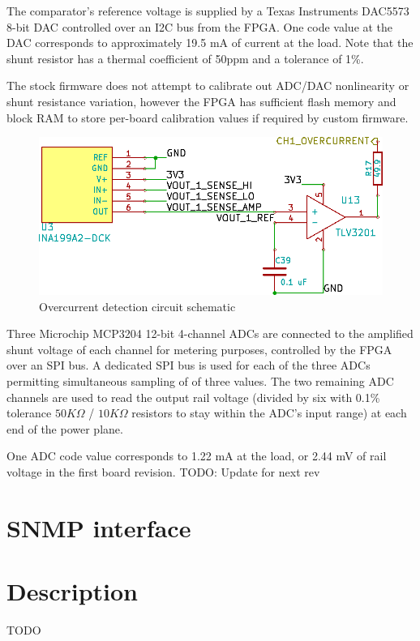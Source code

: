 \documentclass{article}
\begin{document}
The comparator's reference voltage is supplied by a Texas Instruments DAC5573 8-bit DAC controlled over an I2C bus 
from the FPGA. One code value at the DAC corresponds to approximately 19.5 mA of current at the load. Note that the 
shunt resistor has a thermal coefficient of 50ppm and a tolerance of 1\%.

The stock firmware does not attempt to calibrate out ADC/DAC nonlinearity or shunt resistance variation, however the
FPGA has sufficient flash memory and block RAM to store per-board calibration values if required by custom firmware.

\begin{figure}[h!]
\includegraphics[scale=0.25]{output-stage-2.png}
\caption{Overcurrent detection circuit schematic}
\label{output-stage-2}
\end{figure}

Three Microchip MCP3204 12-bit 4-channel ADCs are connected to the amplified shunt voltage of each channel for metering
purposes, controlled by the FPGA over an SPI bus. A dedicated SPI bus is used for each of the three ADCs permitting
simultaneous sampling of of three values. The two remaining ADC channels are used to read the output rail voltage
(divided by six with 0.1\% tolerance $50K\Omega$ / $10K\Omega$ resistors to stay within the ADC's input range) at each
end of the power plane. 

One ADC code value corresponds to 1.22 mA at the load, or 2.44 mV of rail voltage in the first board revision. TODO: 
Update for next rev

\pagebreak
\section{SNMP interface}
\label{sec:snmp}

\section{Description}
TODO
\end{document}
